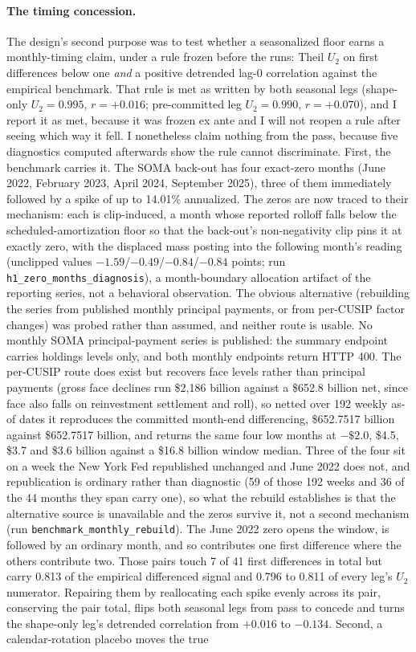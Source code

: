 \documentclass[12pt]{article}
\begin{document}
\paragraph{The timing concession.} The design's second purpose was to test whether a seasonalized floor earns a monthly-timing claim, under a rule frozen before the runs: Theil $U_2$ on first differences below one \emph{and} a positive detrended lag-0 correlation against the empirical benchmark. That rule is met as written by both seasonal legs (shape-only $U_2 = 0.995$, $r = +0.016$; pre-committed leg $U_2 = 0.990$, $r = +0.070$), and I report it as met, because it was frozen ex ante and I will not reopen a rule after seeing which way it fell. I nonetheless claim nothing from the pass, because five diagnostics computed afterwards show the rule cannot discriminate. First, the benchmark carries it. The SOMA back-out has four exact-zero months (June 2022, February 2023, April 2024, September 2025), three of them immediately followed by a spike of up to 14.01\% annualized. The zeros are now traced to their mechanism: each is clip-induced, a month whose reported rolloff falls below the scheduled-amortization floor so that the back-out's non-negativity clip pins it at exactly zero, with the displaced mass posting into the following month's reading (unclipped values $-1.59$/$-0.49$/$-0.84$/$-0.84$ points; run \texttt{h1\_zero\_months\_diagnosis}), a month-boundary allocation artifact of the reporting series, not a behavioral observation. The obvious alternative (rebuilding the series from published monthly principal payments, or from per-CUSIP factor changes) was probed rather than assumed, and neither route is usable. No monthly SOMA principal-payment series is published: the summary endpoint carries holdings levels only, and both monthly endpoints return HTTP 400. The per-CUSIP route does exist but recovers face levels rather than principal payments (gross face declines run \$2{,}186 billion against a \$652.8 billion net, since face also falls on reinvestment settlement and roll), so netted over 192 weekly as-of dates it reproduces the committed month-end differencing, \$652.7517 billion against \$652.7517 billion, and returns the same four low months at $-\$2.0$, \$4.5, \$3.7 and \$3.6 billion against a \$16.8 billion window median. Three of the four sit on a week the New York Fed republished unchanged and June 2022 does not, and republication is ordinary rather than diagnostic (59 of those 192 weeks and 36 of the 44 months they span carry one), so what the rebuild establishes is that the alternative source is unavailable and the zeros survive it, not a second mechanism (run \texttt{benchmark\_monthly\_rebuild}). The June 2022 zero opens the window, is followed by an ordinary month, and so contributes one first difference where the others contribute two. Those pairs touch 7 of 41 first differences in total but carry 0.813 of the empirical differenced signal and 0.796 to 0.811 of every leg's $U_2$ numerator. Repairing them by reallocating each spike evenly across its pair, conserving the pair total, flips both seasonal legs from pass to concede and turns the shape-only leg's detrended correlation from $+0.016$ to $-0.134$. Second, a calendar-rotation placebo moves the true 
\end{document}
